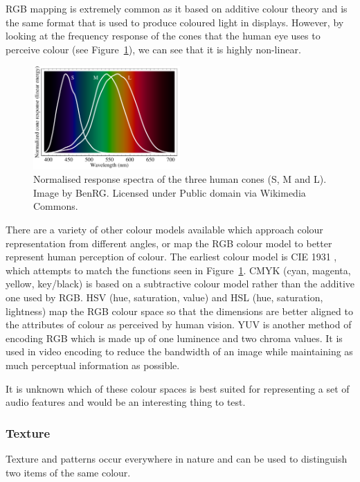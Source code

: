RGB mapping is extremely common as it based on additive colour theory and is
the same format that is used to produce coloured light in displays. However, by
looking at the frequency response of the cones that the human eye uses to
perceive colour (see Figure~\ref{fig:cones}), we can see that it is highly
non-linear.

\begin{figure}[ht]
  \centering
  \includegraphics[width=0.5\textwidth]{figs/cones.pdf}
  \caption{Normalised response spectra of the three human cones (S, M and L).
    Image by BenRG. Licensed under Public domain via Wikimedia Commons.}
  \label{fig:cones}
\end{figure}

There are a variety of other colour models available which approach colour
representation from different angles, or map the RGB colour model to better
represent human perception of colour. The earliest colour model is CIE 1931
\cite{Smith1931}, which attempts to match the functions seen in
Figure~\ref{fig:cones}. CMYK (cyan, magenta, yellow, key/black) is based on a
subtractive colour model rather than the additive one used by RGB.  HSV (hue,
saturation, value) and HSL (hue, saturation, lightness) map the RGB colour
space so that the dimensions are better aligned to the attributes of colour as
perceived by human vision.  YUV is another method of encoding RGB which is made
up of one luminence and two chroma values. It is used in video encoding to
reduce the bandwidth of an image while maintaining as much perceptual
information as possible.

It is unknown which of these colour spaces is best suited for representing a
set of audio features and would be an interesting thing to test.

\subsubsection{Texture}
Texture and patterns occur everywhere in nature and can be used to distinguish
two items of the same colour.

